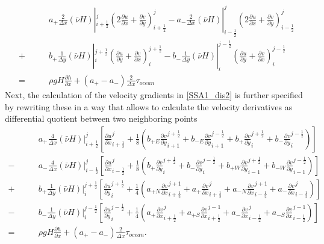 \documentclass[a4paper,10pt]{article}
\begin{document}
\begin{align}
&\qquad a_+\frac{2}{\Delta x}(\bar{\nu} H)|_{i+\frac{1}{2}}^j\left( 2\frac{\partial u}{\partial x} + \frac{\partial v}{\partial y} \right)_{i+\frac{1}{2}}^j
- a_-\frac{2}{\Delta x}(\bar{\nu} H)|_{i-\frac{1}{2}}^j\left( 2\frac{\partial u}{\partial x} + \frac{\partial v}{\partial y} \right)_{i-\frac{1}{2}}^j \nonumber \\
+ &\qquad b_+\frac{1}{\Delta y}(\bar{\nu} H)|_i^{j+\frac{1}{2}}\left(\frac{\partial u}{\partial y}+\frac{\partial v}{\partial x}\right)_i^{j+\frac{1}{2}}
- b_-\frac{1}{\Delta y}(\bar{\nu} H)|_i^{j-\frac{1}{2}}\left(\frac{\partial u}{\partial y}+\frac{\partial v}{\partial x}\right)_i^{j-\frac{1}{2}} \nonumber \\
= &\qquad \rho gH \frac{\partial h}{\partial x} + (a_+ - a_-)\frac{2}{\Delta x}\tau_{ocean} \label{SSA1_dis2}
\end{align}
Next, the calculation of the velocity gradients in \eqref{SSA1_dis2} is further specified by rewriting these in a way that allows to calculate the velocity derivatives as differential quotient between two neighboring points
\begin{align}
&\qquad a_+\frac{4}{\Delta x}(\bar{\nu}H)|_{i+\frac{1}{2}}^j\left[\frac{\partial u}{\partial x}_{i+\frac{1}{2}}^j + \frac{1}{8}\left( b_{+E}\frac{\partial v}{\partial y}_{i+1}^{j+\frac{1}{2}}+b_{-E}\frac{\partial v}{\partial y}_{i+1}^{j-\frac{1}{2}}+b_+\frac{\partial v}{\partial y}_{i}^{j+\frac{1}{2}}+b_-\frac{\partial v}{\partial y}_{i}^{j-\frac{1}{2}}  \right) \right] \nonumber \\
- &\qquad a_-\frac{4}{\Delta x}(\bar{\nu}H)|_{i-\frac{1}{2}}^j\left[\frac{\partial u}{\partial x}_{i-\frac{1}{2}}^j + \frac{1}{8}\left( b_+\frac{\partial v}{\partial y}_{i}^{j+\frac{1}{2}} + b_-\frac{\partial v}{\partial y}_{i}^{j-\frac{1}{2}} + b_{+W}\frac{\partial v}{\partial y}_{i-1}^{j+\frac{1}{2}} + b_{-W}\frac{\partial v}{\partial y}_{i-1}^{j-\frac{1}{2}} \right) \right] \nonumber \\
+ &\qquad b_+\frac{1}{\Delta y}(\bar{\nu}H)|_i^{j+\frac{1}{2}}\left[\frac{\partial u}{\partial y}_i^{j+\frac{1}{2}}+\frac{1}{4}\left( a_{+N}\frac{\partial v}{\partial x}_{i+\frac{1}{2}}^{j+1} + a_+\frac{\partial v}{\partial x}_{i+\frac{1}{2}}^{j} + a_{-N}\frac{\partial v}{\partial x}_{i-\frac{1}{2}}^{j+1} + a_-\frac{\partial v}{\partial x}_{i-\frac{1}{2}}^{j} \right) \right] \nonumber \\
- &\qquad b_-\frac{1}{\Delta y} (\bar{\nu}H)|_i^{j-\frac{1}{2}} \left[\frac{\partial u}{\partial y}_i^{j-\frac{1}{2}}+\frac{1}{4}\left( a_+\frac{\partial v}{\partial x}_{i+\frac{1}{2}}^{j} + a_{+S}\frac{\partial v}{\partial x}_{i+\frac{1}{2}}^{j-1} + a_-\frac{\partial v}{\partial x}_{i-\frac{1}{2}}^{j} + a_{-S}\frac{\partial v}{\partial x}_{i-\frac{1}{2}}^{j-1} \right) \right] \nonumber \\
= &\qquad \rho gH \frac{\partial h}{\partial x} + (a_+ - a_-)\frac{2}{\Delta x}\tau_{ocean}. \label{SSA1_dis3}
\end{align}
\end{document}
